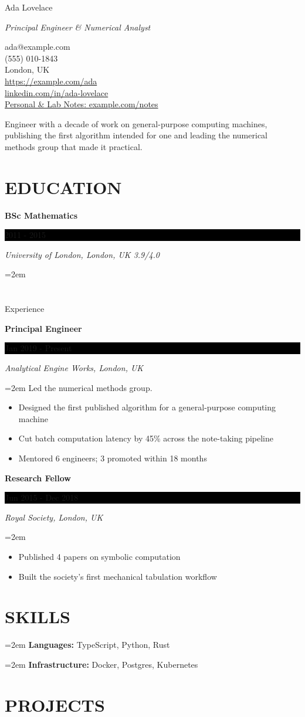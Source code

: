 \documentclass[fontsize=11pt]{article}
\newcommand{\sepspace}{\vspace*{1em}}   %
\newcommand{\MyName}[1]{ %
    \Huge \usefont{OT1}{phv}{b}{n} \hfill #1
    \par \normalsize \normalfont}
\newcommand{\MySlogan}[1]{ %
    \large \usefont{OT1}{phv}{m}{n}\hfill \textit{#1}
    \par \normalsize \normalfont}
\newcommand{\NewPart}[1]{\vspace{3pt}\section*{\uppercase{#1}}}
\newcommand{\SkillsEntry}[2]{
    \noindent\hangindent=2em\hangafter=0 %
    \textbf{#1} #2 \par}                 %
\newcommand{\EducationEntry}[4]{
    \noindent \textbf{#1} \hfill      %
    \colorbox{Black}{
      \parbox{8.5em}{
      \hfill\color{White}#2}} \par  %
    \noindent \textit{#3} \par        %
    \noindent\hangindent=2em\hangafter=0 \small #4 %
    \normalsize \par}
\newcommand{\WorkEntry}[4]{       %
    \noindent \textbf{#1} \hfill      %
    \colorbox{Black}{%
      \parbox{9em}{%
      \hfill\color{White}#2}} \par   %
        \noindent \textit{#3} \par        %
    \noindent\hangindent=2em\hangafter=0 \small #4 %
    \normalsize \par}
\begin{document}
    \MyName{Ada Lovelace}
      \MySlogan{Principal Engineer \& Numerical Analyst}
      \bigskip
      {\small \hfill ada@example.com \\
(555) 010-1843 \\
London, UK \\
\href{https://example.com/ada}{https://example.\allowbreak{}com/\allowbreak{}ada} \\
\href{https://linkedin.com/in/ada-lovelace}{linkedin.\allowbreak{}com/\allowbreak{}in/\allowbreak{}ada-\allowbreak{}lovelace} \\
\href{https://example.com/notes}{Personal \& Lab Notes: example.\allowbreak{}com/\allowbreak{}notes}}
      
\smallskip
{\small Engineer with a decade of work on general-purpose computing machines, publishing the first algorithm intended for one and leading the numerical methods group that made it practical.\par}
    \NewPart{Education}{}
    \EducationEntry
{BSc Mathematics}
{2011 - 2015}
{University of London, London, UK 3.9/4.0}

      \NewPart{Experience}{}

      \WorkEntry
            {Principal Engineer}
            {Jan 2019 - Present}
            {Analytical Engine Works, London, UK}
            {Led the numerical methods group.\par\begin{itemize} \itemsep 2pt
  \item Designed the first published algorithm for a general-purpose computing machine
  \item Cut batch computation latency by 45\% across the note-taking pipeline
  \item Mentored 6 engineers; 3 promoted within 18 months
\end{itemize}}
            \sepspace
      \WorkEntry
            {Research Fellow}
            {Jun 2015 - Dec 2018}
            {Royal Society, London, UK}
            {\begin{itemize} \itemsep 2pt
  \item Published 4 papers on symbolic computation
  \item Built the society's first mechanical tabulation workflow
\end{itemize}}
\NewPart{Skills}{}
\SkillsEntry{Languages:}{TypeScript, Python, Rust}
\SkillsEntry{Infrastructure:}{Docker, Postgres, Kubernetes}
      \NewPart{Projects}{}
\end{document}
